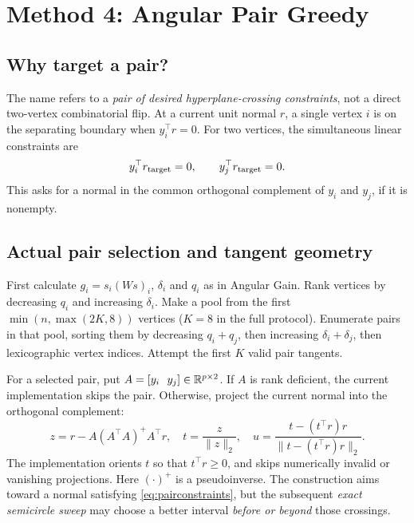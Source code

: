 \section{Method 4: Angular Pair Greedy}\label{sec:pair}
\subsection{Why target a pair?}
The name  refers to a \emph{pair of desired hyperplane-crossing constraints}, not a direct two-vertex combinatorial flip. At a current unit normal $r$, a single vertex $i$ is on the separating boundary when $y_i^\top r=0$. For two vertices, the simultaneous linear constraints are
\begin{equation}\label{eq:pairconstraints}
y_i^\top r_{\rm target}=0,\qquad
y_j^\top r_{\rm target}=0.
\end{equation}
This asks for a normal in the common orthogonal complement of $y_i$ and $y_j$, if it is nonempty.

\subsection{Actual pair selection and tangent geometry}
First calculate $g_i=s_i(Ws)_i$, $\delta_i$ and $q_i$ as in Angular Gain. Rank vertices by decreasing $q_i$ and increasing $\delta_i$. Make a pool from the first $\min(n,\max(2K,8))$ vertices ($K=8$ in the full protocol). Enumerate pairs in that pool, sorting them by decreasing $q_i+q_j$, then increasing $\delta_i+\delta_j$, then lexicographic vertex indices. Attempt the first $K$ valid pair tangents.

For a selected pair, put $A=[y_i\ \ y_j]\in\R^{p\times2}$. If $A$ is rank deficient, the current implementation skips the pair. Otherwise, project the current normal into the orthogonal complement:
\begin{equation}\label{eq:pairproject}
z=r-A(A^\top A)^+A^\top r,\quad
t=\frac{z}{\|z\|_2},\quad
u=\frac{t-(t^\top r)r}{\|t-(t^\top r)r\|_2}.
\end{equation}
The implementation orients $t$ so that $t^\top r\ge0$, and skips numerically invalid or vanishing projections. Here $(\cdot)^+$ is a pseudoinverse. The construction aims toward a normal satisfying \eqref{eq:pairconstraints}, but the subsequent \emph{exact semicircle sweep} may choose a better interval \emph{before or beyond} those crossings.

